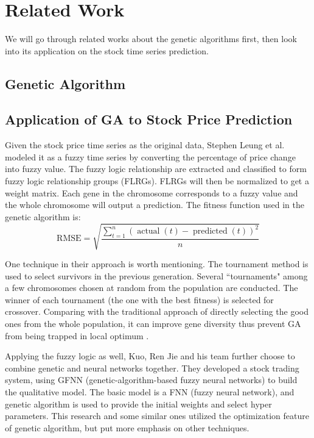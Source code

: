 \documentclass{article}
\begin{document}


\section{Related Work}

We will go through related works about the genetic algorithms first,
then look into its application on the stock time series prediction.

\subsection{Genetic Algorithm}





\subsection{Application of GA to Stock Price Prediction}

Given the stock price time series as the original data,
Stephen Leung et al. \cite{a-novel-stock-forecasting-model-based-on-fuzzy-time-series}
modeled it as a fuzzy time series
by converting the percentage of price change into fuzzy value.
The fuzzy logic relationship are extracted and classified to form fuzzy logic relationship groups (FLRGs).
FLRGs will then be normalized to get a weight matrix.
Each gene in the chromosome corresponds to a fuzzy value
and the whole chromosome will output a prediction.
The fitness function used in the genetic algorithm is:
$$
\text{RMSE} =
\sqrt{ \dfrac {\sum \limits_{t=1}^{n}\left(\operatorname{actual}(t) - \operatorname{predicted}(t)\right)^2 } {n}}
$$

One technique in their approach is worth mentioning.
The tournament method is used to select survivors in the previous generation.
Several ``tournaments" among a few chromosomes chosen at random from the population are conducted.
The winner of each tournament (the one with the best fitness) is selected for crossover.
Comparing with the traditional approach of directly selecting the good ones from the whole population,
it can improve gene diversity thus prevent GA from being trapped in local optimum
\cite{a-note-on-boltzmann-tournament-selecttion}.

Applying the fuzzy logic as well, Kuo, Ren Jie and his team \cite{an-intelligent-stock-trading-decision-support-system}
further choose to combine genetic and neural networks together.
They developed a stock trading system, using GFNN (genetic-algorithm-based fuzzy neural networks)
to build the qualitative model.
The basic model is a FNN (fuzzy neural network), and
genetic algorithm is used to provide the initial weights and select hyper parameters.
This research and some similar ones utilized the optimization feature of genetic algorithm,
but put more emphasis on other techniques.
\end{document}
